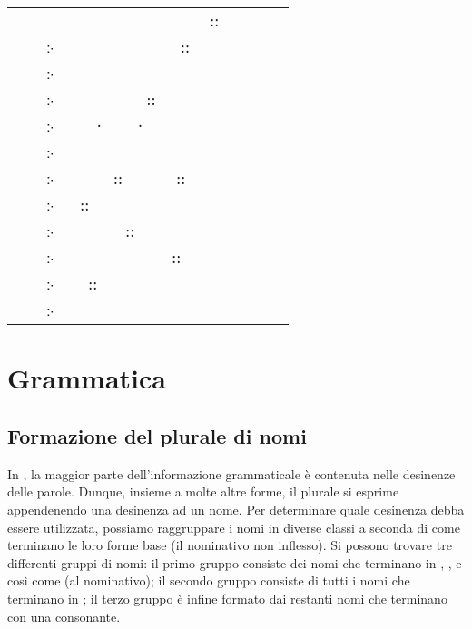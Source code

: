 \section{}
\begin{elvish}
\begin{tabularx}{\textwidth}{r@{ }X}
       &      ⸬   \\
჻ &     ⸬ \\
჻   &   \\
჻ &   ⸬ \\
჻   &  ⸱ ⸱    \\
჻  &   \\
჻ &  ⸬  ⸬    \\
჻  & ⸬ \\
჻ &  ⸬ \\
჻  &    ⸬ \\
჻ & ⸬  \\
჻  & 
\end{tabularx}
\end{elvish}

\section{Grammatica}
\subsection{Formazione del plurale di nomi}
In \quenya, la maggior parte dell'informazione grammaticale è contenuta
nelle desinenze delle parole. Dunque, insieme a molte altre forme, il plurale si
esprime appendenendo una desinenza ad un nome. Per determinare quale desinenza
debba essere utilizzata, possiamo raggruppare i nomi in diverse classi a seconda
di come terminano le loro forme base (il nominativo non inflesso). Si possono
trovare tre differenti gruppi di nomi: il primo gruppo consiste dei nomi che
terminano in , ,  e  così come  (al nominativo);
il secondo gruppo consiste di tutti i nomi che terminano in ; il terzo
gruppo è infine formato dai restanti nomi che terminano con una consonante.

